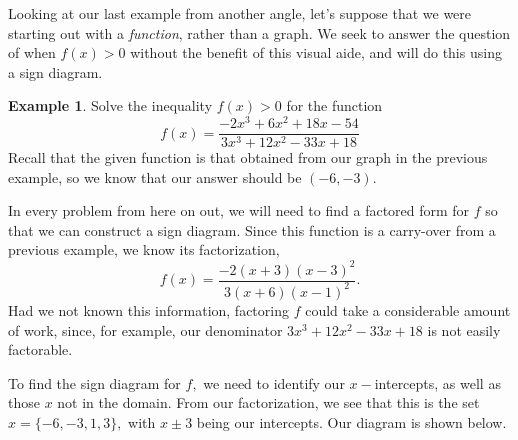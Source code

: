 \documentclass[12pt]{book}
\theoremstyle{definition}
\newtheorem{example}{Example}
\begin{document}
\par
Looking at our last example from another angle, let's suppose that we were starting out with a {\it function}, rather than a graph.  We seek to answer the question of when $f(x)>0$ without the benefit of this visual aide, and will do this using a sign diagram.
\begin{example}Solve the inequality $f(x)>0$ for the function
$$f(x)=\dfrac{-2x^3+6x^2+18x-54}{3x^3+12x^2-33x+18}$$
Recall that the given function is that obtained from our graph in the previous example, so we know that our answer should be $(-6,-3)$.
\par
In every problem from here on out, we will need to find a factored form for $f$ so that we can construct a sign diagram.  Since this function is a carry-over from a previous example, we know its factorization,
$$f(x)=\frac{-2(x+3)(x-3)^2}{3(x+6)(x-1)^2}.$$
Had we not known this information, factoring $f$ could take a considerable amount of work, since, for example, our denominator $3x^3+12x^2-33x+18$ is not easily factorable.
\par
To find the sign diagram for $f,$ we need to identify our $x-$intercepts, as well as those $x$ not in the domain.  From our factorization, we see that this is the set $x=\{-6,-3,1,3\},$ with $x\pm3$ being our intercepts.  Our diagram is shown below.
\par
\begin{center}

\end{center}
\end{example}
\end{document}
